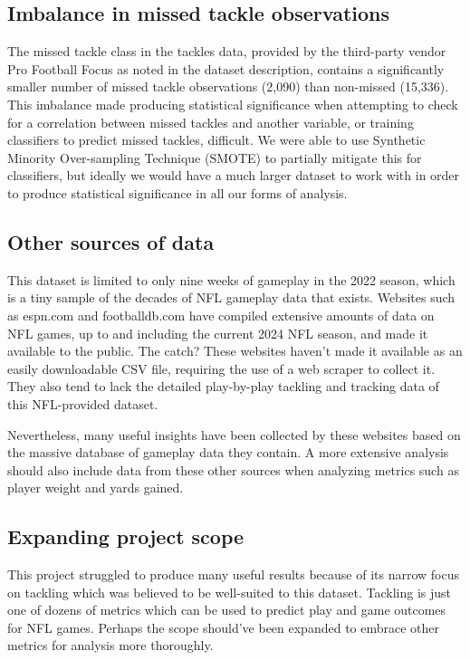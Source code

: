\documentclass[bibtex, sigconf, hyperref={colorlinks=true,linkcolor=blue,urlcolor=blue}]{acmart}
\begin{document}
\subsection{Imbalance in missed tackle observations}

The missed tackle class in the tackles data, provided by the third-party vendor
Pro Football Focus as noted in the dataset description, contains a significantly
smaller number of missed tackle observations (2,090) than non-missed (15,336).
This imbalance made producing statistical significance when attempting to check
for a correlation between missed tackles and another variable, or training
classifiers to predict missed tackles, difficult. We were able to use Synthetic
Minority Over-sampling Technique (SMOTE) to partially mitigate this for
classifiers, but ideally we would have a much larger dataset to work with in
order to produce statistical significance in all our forms of analysis.

\subsection{Other sources of data}

This dataset is limited to only nine weeks of gameplay in the 2022 season, which
is a tiny sample of the decades of NFL gameplay data that exists. Websites such
as espn.com and footballdb.com have compiled extensive amounts of data on NFL
games, up to and including the current 2024 NFL season, and made it available to
the public. The catch? These websites haven't made it available as an easily
downloadable CSV file, requiring the use of a web scraper to collect it. They
also tend to lack the detailed play-by-play tackling and tracking data of this
NFL-provided dataset.

Nevertheless, many useful insights have been collected by these websites based
on the massive database of gameplay data they contain. A more extensive analysis
should also include data from these other sources when analyzing metrics such as
player weight and yards gained.

\subsection{Expanding project scope}

This project struggled to produce many useful results because of its narrow
focus on tackling which was believed to be well-suited to this dataset. Tackling
is just one of dozens of metrics which can be used to predict play and game
outcomes for NFL games. Perhaps the scope should've been expanded to embrace
other metrics for analysis more thoroughly.
\end{document}
